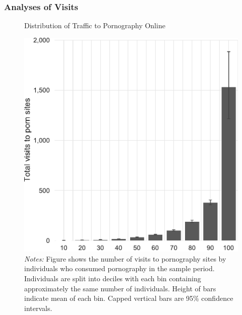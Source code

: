 \documentclass[12pt, letterpaper]{article}
\begin{document}
\subsubsection{Analyses of Visits}
\label{si:visits}
\begin{figure}[ht]
	\centering
	\caption{Distribution of Traffic to Pornography Online}
	\includegraphics[width=.5\linewidth]{../figs/distribution_visits_to_adultsites.pdf}
	\caption*{\footnotesize \emph{Notes:} 
		Figure shows the number of visits to pornography sites by individuals who consumed pornography in the sample period.
		Individuals are split into deciles with each bin containing approximately the same number of individuals.
		Height of bars indicate mean of each bin.
		Capped vertical bars are 95\% confidence intervals.
	}
	\label{fig:distribution_visits}
\end{figure}
\end{document}
